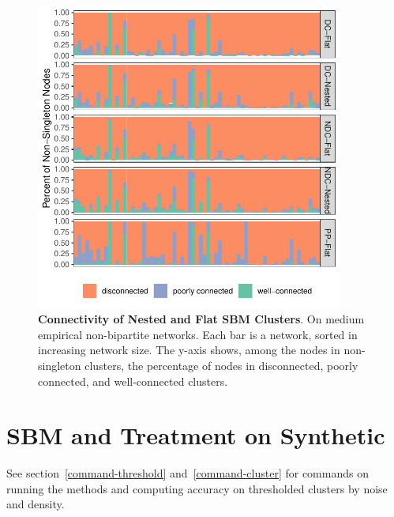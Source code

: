 \documentclass[aps,pre,superscriptaddress]{article}
\begin{document}
\begin{figure}[ht]
	\centering
	\begin{subfloat}
		\centering
		\includegraphics[width=0.9\textwidth]{figures/empirical_connectivity_unchosen_node.pdf}
	\end{subfloat}
	\caption{
        \textbf{Connectivity of Nested and Flat SBM Clusters}.
        On medium empirical non-bipartite networks.
		Each bar is a network, sorted in increasing network size.
        The y-axis shows, among the nodes in non-singleton clusters, the percentage of nodes in disconnected, poorly connected, and well-connected clusters.
	}
\end{figure}
 
\clearpage
\section{SBM and Treatment on Synthetic}

See section~\ref{command-threshold} and~\ref{command-cluster} for commands on running the methods and computing accuracy on thresholded clusters by noise and density.
\end{document}
